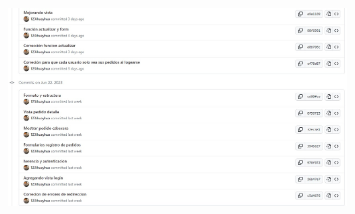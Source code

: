 \documentclass{article}
\begin{document}
    \begin{figure}[H]
		      \centering
                \includegraphics[width=0.8\textwidth,keepaspectratio]{img/N3.jpeg}
	   \end{figure}
\clearpage
\end{document}
